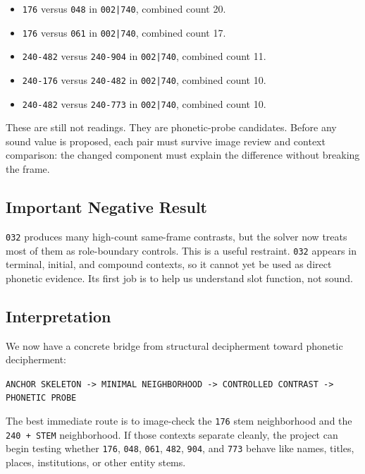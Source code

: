 \begin{itemize}
  \item \texttt{176} versus \texttt{048} in \texttt{002|740}, combined count 20.
  \item \texttt{176} versus \texttt{061} in \texttt{002|740}, combined count 17.
  \item \texttt{240-482} versus \texttt{240-904} in \texttt{002|740}, combined count 11.
  \item \texttt{240-176} versus \texttt{240-482} in \texttt{002|740}, combined count 10.
  \item \texttt{240-482} versus \texttt{240-773} in \texttt{002|740}, combined count 10.
\end{itemize}

These are still not readings. They are phonetic-probe candidates. Before any sound value is proposed, each pair must survive image review and context comparison: the changed component must explain the difference without breaking the frame.

\subsection{Important Negative Result}

\texttt{032} produces many high-count same-frame contrasts, but the solver now treats most of them as role-boundary controls. This is a useful restraint. \texttt{032} appears in terminal, initial, and compound contexts, so it cannot yet be used as direct phonetic evidence. Its first job is to help us understand slot function, not sound.

\subsection{Interpretation}

We now have a concrete bridge from structural decipherment toward phonetic decipherment:

\begin{center}
\texttt{ANCHOR SKELETON -> MINIMAL NEIGHBORHOOD -> CONTROLLED CONTRAST -> PHONETIC PROBE}
\end{center}

The best immediate route is to image-check the \texttt{176} stem neighborhood and the \texttt{240 + STEM} neighborhood. If those contexts separate cleanly, the project can begin testing whether \texttt{176}, \texttt{048}, \texttt{061}, \texttt{482}, \texttt{904}, and \texttt{773} behave like names, titles, places, institutions, or other entity stems.

